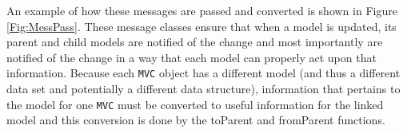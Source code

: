 \documentclass{article}[11pt]
\newcommand{\Rfunction}[1]{{\textsf{#1}}}
\newcommand{\Robject}[1]{{\texttt{#1}}}
\newcommand{\Rslot}[1]{\textsl{#1}}
\newcommand{\Rclass}[1]{\texttt{#1}}
\begin{document}


An example of how these messages are passed and converted is shown in
Figure \ref{Fig:MessPass}.  These message classes ensure that when a
model is updated, its parent and child models are notified of the
change and most importantly are notified of the change in a way that
each model can properly act upon that information.  Because each
\Robject{MVC} object has a different model (and thus a different data
set and potentially a different data structure), information that
pertains to the model for one \Robject{MVC} must be converted to
useful information for the linked model and this conversion is done by
the \Rfunction{toParent} and \Rfunction{fromParent} functions.
\end{document}
